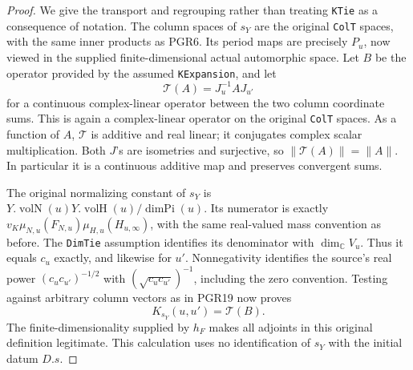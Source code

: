 \documentclass[11pt,a4paper]{article}
\numberwithin{equation}{section}
\theoremstyle{remark}\newtheorem{remark}[theorem]{Remark}
\begin{document}
\begin{proof}
We give the transport and regrouping rather than treating
\texttt{KTie} as a consequence of notation.  The column spaces
of \(s_Y\) are the original \texttt{Col\allowbreak T} spaces, with the
same inner products as PGR6.  Its period maps are precisely
\(P_u\), now viewed in the supplied finite-dimensional actual
automorphic space.  Let \(B\) be the operator provided by the
assumed \texttt{KExpansion}, and let
\[
       \mathcal T(A)=J_u^{-1} A J_{u'}
\tag{PGR.56}
\]
for a continuous complex-linear operator between the two column
coordinate sums.  This is again a complex-linear operator on the
original \texttt{Col\allowbreak T} spaces.  As a function of \(A\),
\(\mathcal T\) is additive and real linear; it conjugates
complex scalar multiplication.  Both \(J\)'s are isometries
and surjective, so
\(\|\mathcal T(A)\|=\|A\|\).
In particular it is a continuous additive map and preserves
convergent sums.

The original normalizing constant of \(s_Y\) is
\(Y.\operatorname{volN}(u)Y.\operatorname{volH}(u)/
\operatorname{dimPi}(u)\).  Its numerator is exactly
\(v_K\mu_{N,u}(F_{N,u})\mu_{H,u}(H_{u,\infty})\),
with the same real-valued mass convention as before.  The
\texttt{Dim\allowbreak Tie} assumption identifies its denominator with
\(\dim_{\mathbb C}V_u\).  Thus it equals \(c_u\) exactly,
and likewise for \(u'\).  Nonnegativity identifies the source's
real power \((c_uc_{u'})^{-1/2}\) with
\((\sqrt{c_uc_{u'}})^{-1}\), including the zero convention.
Testing against arbitrary column vectors as in PGR19 now proves
\[
                 K_{s_Y}(u,u')=\mathcal T(B).
\tag{PGR.57}
\]
The finite-dimensionality supplied by \(h_F\) makes all
adjoints in this original definition legitimate.  This calculation
uses no identification of \(s_Y\) with the initial datum \(D.s\).


\end{proof}
\end{document}
